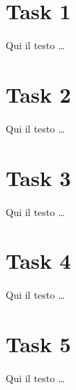 
\chapter{Task 1}
Qui il testo \ldots \\

\chapter{Task 2}
Qui il testo \ldots \\

\chapter{Task 3}
Qui il testo \ldots \\

\chapter{Task 4}
Qui il testo \ldots \\

\chapter{Task 5}
Qui il testo \ldots \\

